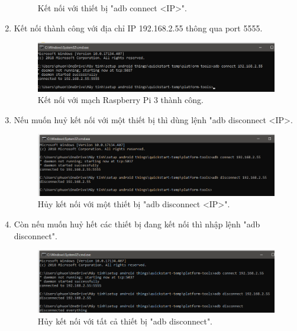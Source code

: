 \begin{enumerate}
\begin{center}
\begin{figure}[htp]
\begin{center}
\end{center}
\caption{Kết nối với thiết bị "adb connect <IP>".}
\label{refhinh1}
\end{figure}
\end{center}
\newpage
\item Kết nối thành công với địa chỉ IP 192.168.2.55 thông qua port 5555.
\begin{center}
\begin{figure}[htp]
\begin{center}
\includegraphics[scale=0.65]{image3/buoc3s15.png}
\end{center}
\caption{Kết nối với mạch Raspberry Pi 3 thành công.}
\label{refhinh1}
\end{figure}
\end{center}
\item Nếu muốn huỷ kết nối với một thiết bị thì dùng lệnh "adb disconnect <IP>.
\begin{center}
\begin{figure}[htp]
\begin{center}
\includegraphics[scale=0.6]{image3/buoc3s16.png}
\end{center}
\caption{Hủy kết nối với một thiết bị "adb disconnect <IP>".}
\end{figure}
\end{center}
\item Còn nếu muốn huỷ hết các thiết bị đang kết nối thì nhập lệnh "adb disconnect".
\begin{center}
\begin{figure}[htp]
\begin{center}
\includegraphics[scale=0.6]{image3/buoc3s17.png}
\end{center}
\caption{Hủy kết nối với tất cả thiết bị "adb disconnect".}
\end{figure}
\end{center}
\end{enumerate}
\newpage

